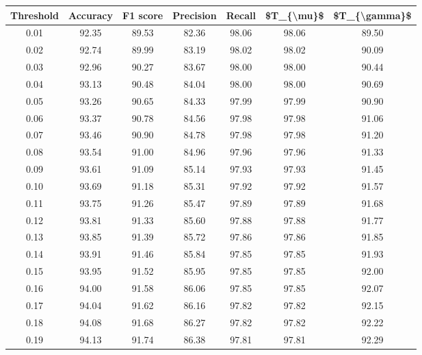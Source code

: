 \begin{tabular}{|c|c|c|c|c|c|c|}
\hline
 Threshold &  Accuracy &  F1 score &  Precision &  Recall &  \$T\_\{\textbackslash mu\}\$ &  \$T\_\{\textbackslash gamma\}\$ \\
\hline
      0.01 &     92.35 &     89.53 &      82.36 &   98.06 &      98.06 &         89.50 \\
      0.02 &     92.74 &     89.99 &      83.19 &   98.02 &      98.02 &         90.09 \\
      0.03 &     92.96 &     90.27 &      83.67 &   98.00 &      98.00 &         90.44 \\
      0.04 &     93.13 &     90.48 &      84.04 &   98.00 &      98.00 &         90.69 \\
      0.05 &     93.26 &     90.65 &      84.33 &   97.99 &      97.99 &         90.90 \\
      0.06 &     93.37 &     90.78 &      84.56 &   97.98 &      97.98 &         91.06 \\
      0.07 &     93.46 &     90.90 &      84.78 &   97.98 &      97.98 &         91.20 \\
      0.08 &     93.54 &     91.00 &      84.96 &   97.96 &      97.96 &         91.33 \\
      0.09 &     93.61 &     91.09 &      85.14 &   97.93 &      97.93 &         91.45 \\
      0.10 &     93.69 &     91.18 &      85.31 &   97.92 &      97.92 &         91.57 \\
      0.11 &     93.75 &     91.26 &      85.47 &   97.89 &      97.89 &         91.68 \\
      0.12 &     93.81 &     91.33 &      85.60 &   97.88 &      97.88 &         91.77 \\
      0.13 &     93.85 &     91.39 &      85.72 &   97.86 &      97.86 &         91.85 \\
      0.14 &     93.91 &     91.46 &      85.84 &   97.85 &      97.85 &         91.93 \\
      0.15 &     93.95 &     91.52 &      85.95 &   97.85 &      97.85 &         92.00 \\
      0.16 &     94.00 &     91.58 &      86.06 &   97.85 &      97.85 &         92.07 \\
      0.17 &     94.04 &     91.62 &      86.16 &   97.82 &      97.82 &         92.15 \\
      0.18 &     94.08 &     91.68 &      86.27 &   97.82 &      97.82 &         92.22 \\
      0.19 &     94.13 &     91.74 &      86.38 &   97.81 &      97.81 &         92.29 \\

\end{tabular}
